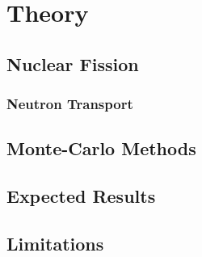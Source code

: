 

\section{Theory}

\subsection{Nuclear Fission}

\subsubsection{Neutron Transport}

\subsection{Monte-Carlo Methods}

\subsection{}

\subsection{Expected Results}

\subsection{Limitations}